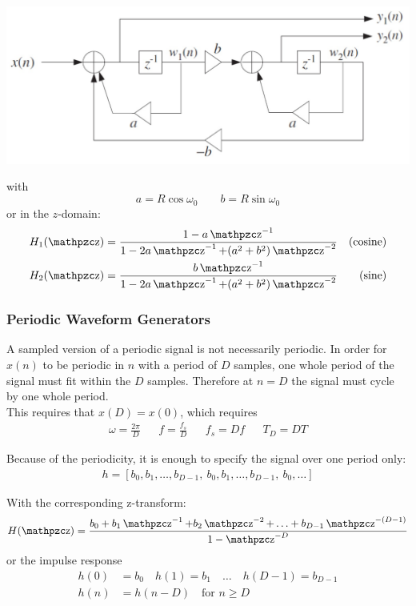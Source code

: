 \begin{center}
	\includegraphics[width=\linewidth]{images/SignProcApp_SinCoupledForm.jpg}
\end{center}
with
\begin{equation*}
	a = R \cos \omega_0 \qquad b = R \sin \omega_0
\end{equation*}
or in the $z$-domain:
\begin{align*}
	H_1(\z) &= \frac{1 - a \z^{-1}}{1 - 2 a \z^{-1} + (a^2+b^2) \z^{-2}}  &\text{(cosine)} \\
	H_2(\z) &= \frac{b \z^{-1}}{1 - 2 a \z^{-1} + (a^2+b^2) \z^{-2}} &\text{(sine)}
\end{align*}

\subsubsection{Periodic Waveform Generators}
A sampled version of a periodic signal is not necessarily periodic. 
In order for $x(n)$ to be periodic in $n$ with a period of $D$ samples,
one whole period of the signal must fit within the $D$ samples. 
Therefore at $n = D$ the signal must cycle by one whole period. \\

This requires that $x(D) = x(0)$, which requires
\begin{align*}
	\omega = \frac{2\pi}{D} && f = \frac{f_s}{D} && f_s = Df && T_D = DT
\end{align*}


Because of the periodicity, it is enough to specify the signal over one period only:
\begin{align*}
	h = [b_0, b_1, \ldots, b_{D-1}, \: b_0, b_1, \ldots, b_{D-1}, \: b_0, \ldots]
\end{align*}

With the corresponding z-transform:
\begin{align*}
	H(\z) = \frac{b_0 + b_1 \z^{-1} + b_2 \z^{-2} + \ldots + b_{D-1} \z^{-(D-1)}}{1 - \z^{-D}}
\end{align*}
or the impulse response
\begin{align*}
	h(0) &= b_0 \quad h(1) = b_1 \quad \ldots \quad h(D-1) = b_{D-1} \\
	h(n) &= h(n-D) \quad \text{for } n \geq D
\end{align*}

